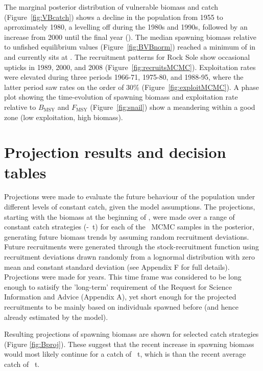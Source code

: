 The marginal posterior distribution of vulnerable biomass and catch (Figure~\ref{fig:VBcatch}) shows a decline in the population from 1955 to aprroximately 1980, a levelling off during the 1980s and 1990s, followed by an increase from 2000 until the final year (). 
The median spawning biomass relative to unfished equilibrium values (Figure~\ref{fig:BVBnorm}) reached a minimum of  in  and currently sits at . 
The recruitment patterns for  Rock Sole show occasional upticks in 1989, 2000, and 2008 (Figure~\ref{fig:recruitsMCMC}). 
Exploitation rates were elevated during three periods 1966-71, 1975-80, and 1988-95, where the latter period saw rates on the order of 30\% (Figure~\ref{fig:exploitMCMC}).
A phase plot showing the time-evolution of spawning biomass and exploitation rate relative to $B_\mathrm{MSY}$ and $F_\mathrm{MSY}$ (Figure~\ref{fig:snail}) show a meandering within a good zone (low exploitation, high biomass).

\section{Projection results and decision tables}

Projections were made to evaluate the future behaviour of the population under different levels of constant catch, given the model assumptions.  The projections, starting with the biomass at the beginning of , were made over a range of constant catch strategies (-~t) for each of the \numMCMC~MCMC samples in the posterior, generating future biomass trends by assuming random recruitment deviations.  Future recruitments were generated through the stock-recruitment function using recruitment deviations drawn randomly from a lognormal distribution with zero mean and constant standard deviation (see Appendix F for full details). Projections were made for  years. This time frame was considered to be long enough to satisify the 'long-term' requirement of the Request for Science Information and Advice (Appendix A), yet short enough for the projected recruitments to be mainly based on individuals spawned before  (and hence already estimated by the model).

Resulting projections of spawning biomass are shown for selected catch strategies (Figure \ref{fig:Bproj}). These suggest that the recent increase in spawning biomass would most likely continue for a catch of ~t, which is  than the recent average catch of ~t. 

